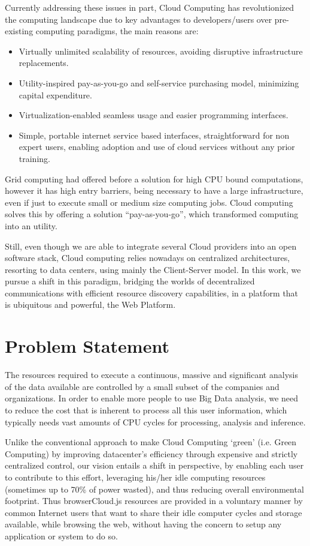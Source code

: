 Currently addressing these issues in part, Cloud Computing has revolutionized the computing landscape due to key advantages to developers/users over pre-existing computing paradigms, the main reasons are:

\begin{itemize}
    \item Virtually unlimited scalability of resources, avoiding disruptive infrastructure replacements.
    \item Utility-inspired pay-as-you-go and self-service purchasing model, minimizing capital expenditure.
    \item Virtualization-enabled seamless usage and easier programming interfaces.
    \item Simple, portable internet service based interfaces, straightforward for non expert users, enabling adoption and use of cloud services without any prior training.
\end{itemize}

Grid computing had offered before a solution for high CPU bound computations, however it has high entry barriers, being necessary to have a large infrastructure, even if just to execute small or medium size computing jobs. Cloud computing solves this by offering a solution ``pay-as-you-go'', which transformed computing into an utility.

Still, even though we are able to integrate several Cloud providers into an open software stack, Cloud computing relies nowadays on centralized architectures, resorting to data centers, using mainly the Client-Server model. In this work, we pursue a shift in this paradigm, bridging the worlds of decentralized communications with efficient resource discovery capabilities, in a platform that is ubiquitous and powerful, the Web Platform.

\section{Problem Statement}

The resources required to execute a continuous, massive and significant analysis of the data available are controlled by a small subset of the companies and organizations. In order to enable more people to use Big Data analysis, we need to reduce the cost that is inherent to process all this user information, which typically needs vast amounts of CPU cycles for processing, analysis and inference.

Unlike the conventional approach to make Cloud Computing `green' (i.e. Green Computing) by improving datacenter's efficiency through expensive and strictly centralized control, our vision entails a shift in perspective, by enabling each user to contribute to this effort, leveraging his/her idle computing resources (sometimes up to 70\% of power wasted), and thus reducing overall environmental footprint. Thus browserCloud.js resources are provided in a voluntary manner by common Internet users that want to share their idle computer cycles and storage available, while browsing the web, without having the concern to setup any application or system to do so.


